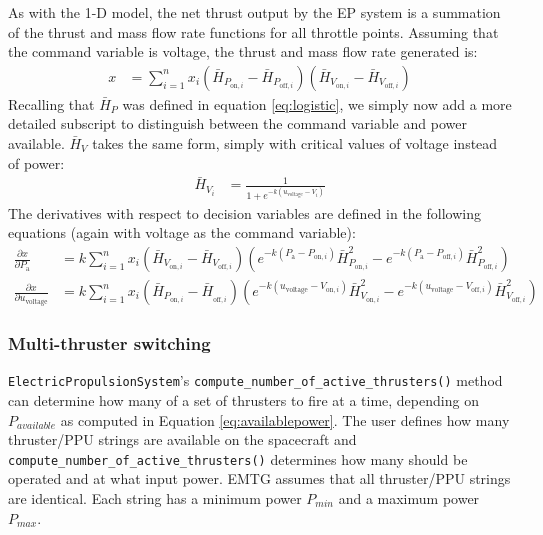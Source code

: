 As with the 1-D model, the net thrust output by the EP system is a summation of the thrust and mass flow rate functions for all throttle points. Assuming that the command variable is voltage, the thrust and mass flow rate generated is:
\begin{align}
x &= \sum\limits_{i=1}^{n}x_i(\bar{H}_{P_{\textrm{on},i}} - \bar{H}_{P_{\textrm{off},i}})(\bar{H}_{V_{\textrm{on},i}} - \bar{H}_{V_{\textrm{off},i}})
\label{eq:2dthrustnet}
\end{align}
Recalling that $\bar{H}_P$ was defined in equation \ref{eq:logistic}, we simply now add a more detailed subscript to distinguish between the command variable and power available. $\bar{H}_V$ takes the same form, simply with critical values of voltage instead of power:
\begin{align}
\bar{H}_{V_i} &= \frac{1}{1 + e^{-k(u_{\textrm{voltage}}-V_i)}}
\label{eq:logisticVoltage}
\end{align}
The derivatives with respect to decision variables are defined in the following equations (again with voltage as the command variable):
\begin{align}
\frac{\partial x}{\partial P_\textrm{a}} &= k\sum\limits_{i=1}^{n}x_i(\bar{H}_{V_{\textrm{on},i}} - \bar{H}_{V_{\textrm{off},i}})(e^{-k(P_\textrm{a}-P_{\textrm{on},i})}\bar{H}^2_{P_{\textrm{on},i}}-e^{-k(P_\textrm{a}-P_{\textrm{off},i})}\bar{H}^2_{P_{\textrm{off},i}})
\label{eq:2dstepped_thrust_dp}\\
\frac{\partial x}{\partial u_{\textrm{voltage}}} &= k\sum\limits_{i=1}^{n}x_i(\bar{H}_{P_{\textrm{on},i}} - \bar{H}_{_{\textrm{off},i}})(e^{-k(u_{\textrm{voltage}}-V_{\textrm{on},i})}\bar{H}^2_{V_{\textrm{on},i}}-e^{-k(u_{\textrm{voltage}}-V_{\textrm{off},i})}\bar{H}^2_{V_{\textrm{off},i}})
\label{eq:2dstepped_mdot_dvoltage}
\end{align} 

\subsubsection{Multi-thruster switching}
\label{subsubsec:multi-thruster-switching}

\texttt{ElectricPropulsionSystem}'s \texttt{compute\_number\_of\_active\_thrusters()} method can determine how many of a set of thrusters to fire at a time, depending on $P_{available}$ as computed in Equation \ref{eq:availablepower}. The user defines how many thruster/\ac{PPU} strings are available on the spacecraft and \texttt{compute\_number\_of\_active\_thrusters()} determines how many should be operated and at what input power. \ac{EMTG} assumes that all thruster/\ac{PPU} strings are identical. Each string has a minimum power $P_{min}$ and a maximum power $P_{max}$.


